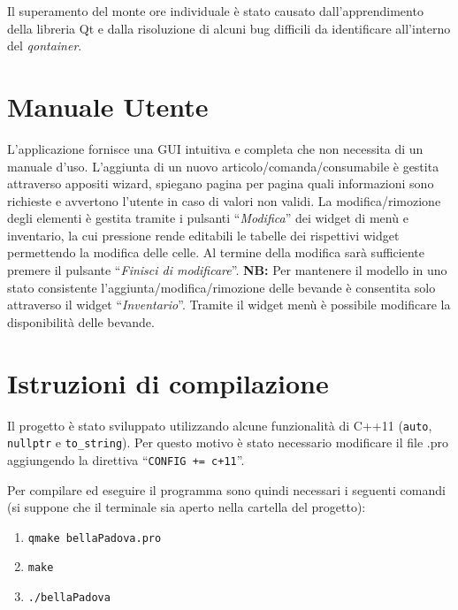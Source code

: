 \documentclass[
  10pt,
]{article}
\providecommand{\tightlist}{%
  \setlength{\itemsep}{0pt}\setlength{\parskip}{0pt}}
\begin{document}
Il superamento del monte ore individuale è stato causato
dall'apprendimento della libreria Qt e dalla risoluzione di alcuni bug
difficili da identificare all'interno del \emph{qontainer}.

\hypertarget{manuale-utente}{%
\section{Manuale Utente}\label{manuale-utente}}

L'applicazione fornisce una GUI intuitiva e completa che non necessita
di un manuale d'uso. L'aggiunta di un nuovo articolo/comanda/consumabile
è gestita attraverso appositi wizard, spiegano pagina per pagina quali
informazioni sono richieste e avvertono l'utente in caso di valori non
validi. \newline La modifica/rimozione degli elementi è gestita tramite i pulsanti
``\emph{Modifica}'' dei widget di menù e inventario, la cui pressione
rende editabili le tabelle dei rispettivi widget permettendo la modifica
delle celle. Al termine della modifica sarà sufficiente premere il
pulsante ``\emph{Finisci di modificare}''. \newpage \textbf{NB:} Per mantenere il
modello in uno stato consistente l'aggiunta/modifica/rimozione delle
bevande è consentita solo attraverso il widget ``\emph{Inventario}''.
Tramite il widget menù è possibile modificare la disponibilità delle
bevande.

\hypertarget{istruzioni-di-compilazione}{%
\section{Istruzioni di compilazione}\label{istruzioni-di-compilazione}}

Il progetto è stato sviluppato utilizzando alcune funzionalità di C++11
(\texttt{auto}, \texttt{nullptr} e \texttt{to\_string}). Per questo
motivo è stato necessario modificare il file .pro aggiungendo la
direttiva ``\texttt{CONFIG\ +=\ c+11}''.

Per compilare ed eseguire il programma sono quindi necessari i seguenti
comandi (si suppone che il terminale sia aperto nella cartella del
progetto):

\begin{enumerate}
\def\labelenumi{\arabic{enumi}.}
\tightlist
\item
  \texttt{qmake\ bellaPadova.pro}
\item
  \texttt{make}
\item
  \texttt{./bellaPadova}
\end{enumerate}
\end{document}
